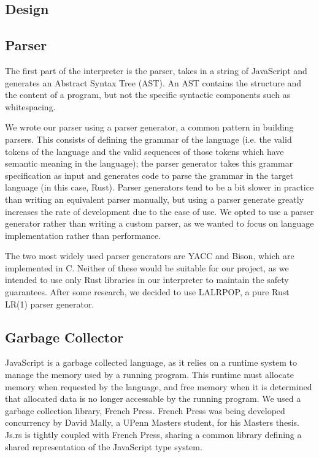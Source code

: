\documentclass{article}
\begin{document}
\begin{multicols}{2}
\section{Design}

\subsection{Parser}

The first part of the interpreter is the parser,
takes in a string of JavaScript and generates an Abstract Syntax Tree (AST).
An AST contains the structure and the content of a program, but not the specific
syntactic components such as whitespacing. \newline

We wrote our parser using a parser generator, a common pattern in building
parsers. This consists of defining the grammar of the language (i.e. the valid
tokens of the language and the valid sequences of those tokens which have
semantic meaning in the language); the parser generator takes this grammar
specification as input and generates code to parse the grammar in the target
language (in this case, Rust). Parser generators tend to be a bit slower in
practice than writing an equivalent parser manually, but using a parser generate
greatly increases the rate of development due to the ease of use. We opted to
use a parser generator rather than writing a custom parser, as we wanted to
focus on language implementation rather than performance. \newline

The two most widely used parser generators are YACC and Bison, which are
implemented in C. Neither of these would be suitable for our project, as we
intended to use only Rust libraries in our interpreter to maintain the safety
guarantees. After some research, we decided to use LALRPOP, a pure Rust LR(1)
parser generator\cite{lalrpop}.

\subsection{Garbage Collector}

JavaScript is a garbage collected language, as it relies on a runtime system to
manage the memory used by a running program. This runtime must allocate memory
when requested by the language, and free memory when it is determined that
allocated data is no longer accessable by the running program. We used a garbage
collection library, French Press. French Press was being developed concurrency
by David Mally, a UPenn Masters student, for his Masters thesis. Js.rs is
tightly coupled with French Press, sharing a common library defining a shared
representation of the JavaScript type system.


\end{multicols}
\end{document}
